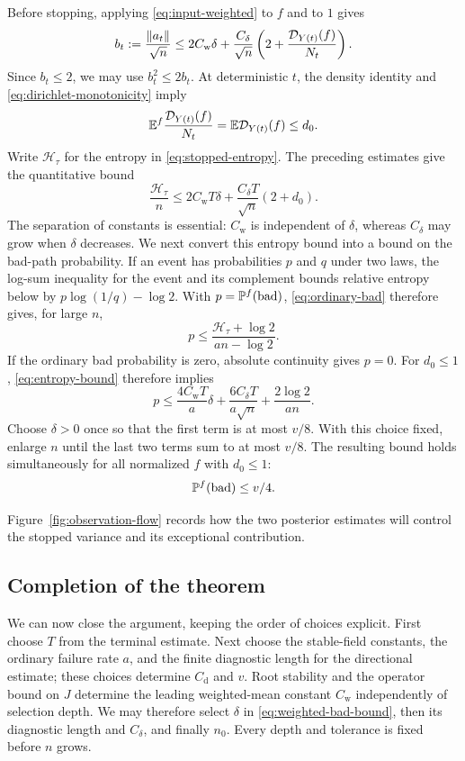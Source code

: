 Before stopping, applying \eqref{eq:input-weighted} to $f$ and to $1$ gives
\[
 b_t:=\frac{\lVert a_t\rVert}{\sqrt n}
 \le2C_{\mathrm w}\delta+\frac{C_\delta}{\sqrt n}
                   \left(2+\frac{\mathcal D_{Y(t)}(f)}{N_t}\right).
\]
Since $b_t\le2$, we may use $b_t^2\le2b_t$. At deterministic $t$, the density
identity and \eqref{eq:dirichlet-monotonicity} imply
\begin{equation}\label{eq:weighted-dirichlet}
 \mathbb E^f\frac{\mathcal D_{Y(t)}(f)}{N_t}
 =\mathbb E\mathcal D_{Y(t)}(f)\le d_0.
\end{equation}
Write $\mathcal H_\tau$ for the entropy in \eqref{eq:stopped-entropy}.
The preceding estimates give the quantitative bound
\begin{equation}\label{eq:entropy-bound}
 \frac{\mathcal H_\tau}{n}
 \le 2C_{\mathrm w}T\delta
       +\frac{C_\delta T}{\sqrt n}(2+d_0).
\end{equation}
The separation of constants is essential: $C_{\mathrm w}$ is independent
of $\delta$, whereas $C_\delta$ may grow when $\delta$ decreases.
We next convert this entropy bound into a bound on the bad-path probability.
If an event has probabilities $p$ and $q$ under two laws, the log-sum
inequality for the event and its complement bounds relative entropy below
by $p\log(1/q)-\log2$. With $p=\mathbb P^f(\mathrm{bad})$,
\eqref{eq:ordinary-bad} therefore gives, for large $n$,
\[
 p\le\frac{\mathcal H_\tau+\log2}{an-\log2}.
\]
If the ordinary bad probability is zero, absolute continuity gives $p=0$.
For $d_0\le1$, \eqref{eq:entropy-bound} therefore implies
\begin{equation}\label{eq:weighted-bad-bound}
 p\le\frac{4C_{\mathrm w}T}{a}\delta
       +\frac{6C_\delta T}{a\sqrt n}
       +\frac{2\log2}{an}.
\end{equation}
Choose $\delta>0$ once so that the first term is at most $v/8$.
With this choice fixed, enlarge $n$ until the last two terms sum to at
most $v/8$. The resulting bound holds simultaneously for all normalized
$f$ with $d_0\le1$:
\begin{equation}\label{eq:weighted-bad}
 \mathbb P^f(\mathrm{bad})\le v/4.
\end{equation}

Figure~\ref{fig:observation-flow} records how the two posterior estimates
will control the stopped variance and its exceptional contribution.


\subsection{Completion of the theorem}
We can now close the argument, keeping the order of choices explicit.
First choose $T$ from the terminal estimate. Next choose the stable-field
constants, the ordinary failure rate $a$, and the finite diagnostic length
for the directional estimate; these choices determine $C_{\mathrm d}$
and $v$. Root stability and the operator bound on $J$ determine the
leading weighted-mean constant $C_{\mathrm w}$ independently of selection
depth. We may therefore select $\delta$ in
\eqref{eq:weighted-bad-bound}, then its diagnostic length and
$C_\delta$, and finally $n_0$. Every depth and tolerance is fixed before
$n$ grows.

